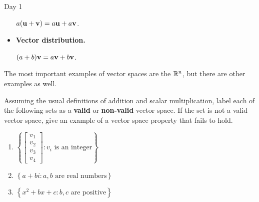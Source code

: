 \begin{applicationActivities}{Day 1}
\begin{definition}
\begin{multicols}{2}
\begin{itemize}
          \(a(\mathbf u+\mathbf v)=a\mathbf u+a\mathbf v\).
    \item \textbf{Vector distribution.}

          \((a+b)\mathbf v=a\mathbf v+b\mathbf v\).
  \end{itemize}
  \end{multicols}
\end{definition}

\begin{definition}
  The most important examples of vector spaces are the  \(\mathbb{R}^n\), but there are other examples as well.
\end{definition}

\begin{activity}{15}
  Assuming the usual definitions of addition and scalar multiplication,
  label each of the following sets as a \textbf{valid} or \textbf{non-valid}
  vector space. If the set is not a valid vector space, give an example of
  a vector space property that fails to hold.
  \begin{multicols}{2}
  \begin{enumerate}
    \item \(\left\{
    \begin{bmatrix}
      v_1\\v_2\\v_3\\v_4
    \end{bmatrix}:v_i\text{ is an integer}\right\}\)
    \item \(\left\{
      a+bi
      :a,b\text{ are real numbers}\right\}\)
    \item \(\left\{
      x^2+bx+c
      :b,c\text{ are positive}\right\}\)
  \end{enumerate}
  \end{multicols}
\end{activity}



\end{applicationActivities}
